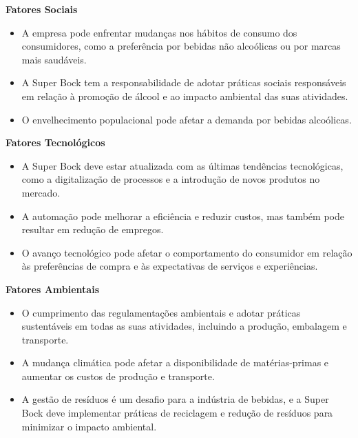 \noindent \textbf{Fatores Sociais} %
\begin{itemize}
    \item A empresa pode enfrentar mudanças nos hábitos de consumo dos consumidores, como a preferência por bebidas não alcoólicas ou por marcas mais saudáveis.
    \item A Super Bock tem a responsabilidade de adotar práticas sociais responsáveis em relação à promoção de álcool e ao impacto ambiental das suas atividades.
    \item O envelhecimento populacional pode afetar a demanda por bebidas alcoólicas.
\end{itemize}

\newpage
\noindent \textbf{Fatores Tecnológicos} %
\begin{itemize}
    \item A Super Bock deve estar atualizada com as últimas tendências tecnológicas, como a digitalização de processos e a introdução de novos produtos no mercado.
    \item A automação pode melhorar a eficiência e reduzir custos, mas também pode resultar em redução de empregos.
    \item O avanço tecnológico pode afetar o comportamento do consumidor em relação às preferências de compra e às expectativas de serviços e experiências.
\end{itemize}


\noindent \textbf{Fatores Ambientais} %
\begin{itemize}
    \item O cumprimento das regulamentações ambientais e adotar práticas sustentáveis em todas as suas atividades, incluindo a produção, embalagem e transporte.
    \item A mudança climática pode afetar a disponibilidade de matérias-primas e aumentar os custos de produção e transporte.
    \item A gestão de resíduos é um desafio para a indústria de bebidas, e a Super Bock deve implementar práticas de reciclagem e redução de resíduos para minimizar o impacto ambiental.
\end{itemize}

